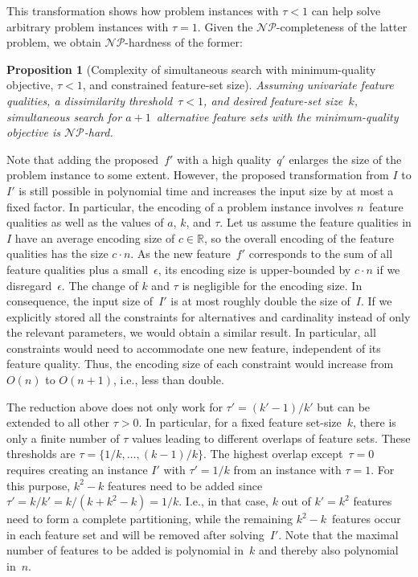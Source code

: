 \documentclass{article}
\newtheorem{proposition}[corollary]{Proposition} %
\theoremstyle{definition}
\begin{document}
This transformation shows how problem instances with $\tau < 1$ can help solve arbitrary problem instances with $\tau = 1$.
Given the $\mathcal{NP}$-completeness of the latter problem, we obtain $\mathcal{NP}$-hardness of the former:
%
\begin{proposition}[Complexity of simultaneous search with minimum-quality objective, $\tau < 1$, and constrained feature-set size]
	Assuming univariate feature qualities, a dissimilarity threshold~$\tau < 1$, and desired feature-set size~$k$, simultaneous search for $a + 1$~alternative feature sets with the minimum-quality objective is $\mathcal{NP}$-hard.
	\label{prop:afs:complexity-no-partitioning-min-constrained-k}
\end{proposition}
%
Note that adding the proposed~$f'$ with a high quality~$q'$ enlarges the size of the problem instance to some extent.
However, the proposed transformation from $I$ to $I'$ is still possible in polynomial time and increases the input size by at most a fixed factor.
In particular, the encoding of a problem instance involves $n$~feature qualities as well as the values of $a$, $k$, and $\tau$.
Let us assume the feature qualities in $I$ have an average encoding size of $c \in \mathbb{R}$, so the overall encoding of the feature qualities has the size $c \cdot n$.
As the new feature~$f'$ corresponds to the sum of all feature qualities plus a small~$\epsilon$, its encoding size is upper-bounded by $c \cdot n$ if we disregard~$\epsilon$.
The change of $k$ and $\tau$ is negligible for the encoding size.
In consequence, the input size of~$I'$ is at most roughly double the size of~$I$.
If we explicitly stored all the constraints for alternatives and cardinality instead of only the relevant parameters, we would obtain a similar result.
In particular, all constraints would need to accommodate one new feature, independent of its feature quality.
Thus, the encoding size of each constraint would increase from $O(n)$ to $O(n+1)$, i.e., less than double.

The reduction above does not only work for $\tau' = (k' - 1) / k'$ but can be extended to all other $\tau > 0$.
In particular, for a fixed feature set-size~$k$, there is only a finite number of $\tau$ values leading to different overlaps of feature sets.
These thresholds are $\tau = \{1/k, \dots, (k - 1) / k\}$.
The highest overlap except~$\tau=0$ requires creating an instance $I'$ with $\tau'= 1/k$ from an instance with $\tau = 1$.
For this purpose, $k^2 - k$ features need to be added since $\tau' = k / k' = k / (k + k^2 -k) = 1/k$.
I.e., in that case, $k$ out of $k' = k^2$ features need to form a complete partitioning, while the remaining $k^2 - k$~features occur in each feature set and will be removed after solving~$I'$.
Note that the maximal number of features to be added is polynomial in~$k$ and thereby also polynomial in~$n$.
\end{document}
